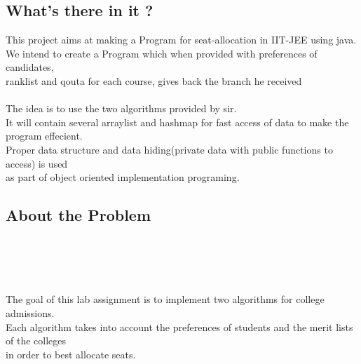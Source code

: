 \documentclass{article}
\begin{document}
\subsection*{What's there in it ?}
\hspace*{5 mm}This project aims at making a Program for seat-allocation in IIT-JEE using java. \\
\hspace*{5 mm}We intend to create a Program which when provided with preferences of candidates, \\
\hspace*{5 mm}ranklist and qouta for each course, gives back the branch he received \\
\hspace*{5 mm} \\
\hspace*{5 mm}The idea is to use the two algorithms provided by sir.\\
\hspace*{5 mm}It will contain several arraylist and hashmap for fast access of data to make the program effecient. \\
\hspace*{5 mm}Proper data structure and data hiding(private data with public functions to access) is used \\
\hspace*{5 mm}as part of object oriented implementation programing. \\
\pagebreak
\begin{center}
\section*{About the Problem}
\end{center}
\hspace*{5 mm} \\
\hspace*{5 mm} \\
\hspace*{5 mm} \\
\hspace*{5 mm} \\
\hspace*{5 mm}The goal of this lab assignment is to implement two algorithms for college admissions. \\
\hspace*{5 mm}Each algorithm takes into account the preferences of students and the merit lists of the colleges \\
\hspace*{5 mm}in order to best allocate seats. \\
\end{document}
